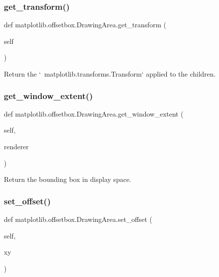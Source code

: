 \subsubsection{\texorpdfstring{get\+\_\+transform()}{get\_transform()}}
{\footnotesize\ttfamily def matplotlib.\+offsetbox.\+Drawing\+Area.\+get\+\_\+transform (\begin{DoxyParamCaption}\item[{}]{self }\end{DoxyParamCaption})}

\begin{DoxyVerb}Return the `~matplotlib.transforms.Transform` applied to the children.
\end{DoxyVerb}
 \mbox{\label{classmatplotlib_1_1offsetbox_1_1DrawingArea_ae8d439782feaa9cda8eb40d405eab165}} 
\subsubsection{\texorpdfstring{get\+\_\+window\+\_\+extent()}{get\_window\_extent()}}
{\footnotesize\ttfamily def matplotlib.\+offsetbox.\+Drawing\+Area.\+get\+\_\+window\+\_\+extent (\begin{DoxyParamCaption}\item[{}]{self,  }\item[{}]{renderer }\end{DoxyParamCaption})}

\begin{DoxyVerb}Return the bounding box in display space.\end{DoxyVerb}
 \mbox{\label{classmatplotlib_1_1offsetbox_1_1DrawingArea_a7db51c414fb111f8de13ab069be53744}} 
\subsubsection{\texorpdfstring{set\+\_\+offset()}{set\_offset()}}
{\footnotesize\ttfamily def matplotlib.\+offsetbox.\+Drawing\+Area.\+set\+\_\+offset (\begin{DoxyParamCaption}\item[{}]{self,  }\item[{}]{xy }\end{DoxyParamCaption})}

